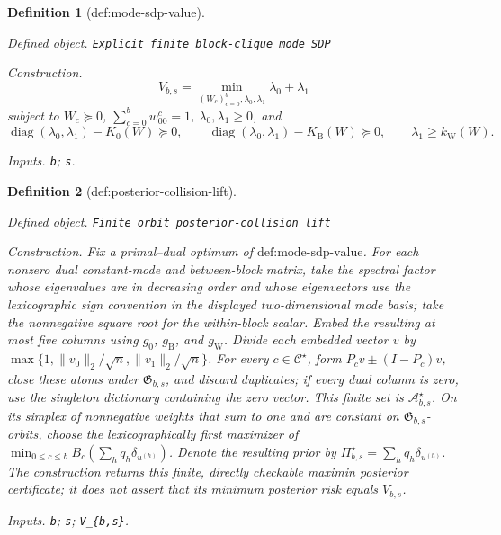 \documentclass{article}
\newtheorem{definition}{Definition}
\begin{document}
\begin{definition}[def:mode-sdp-value]\label{def:mode-sdp-value}
\par\smallskip\noindent\emph{Defined object.} \texttt{Explicit finite block-\allowbreak{}clique mode SDP}
\par\smallskip\noindent\emph{Construction.} \[V_{b,s}=\min_{(W_c)_{c=0}^b,\lambda_0,\lambda_1}\lambda_0+\lambda_1\] subject to \(W_c\succeq0\), \(\sum_{c=0}^bw^c_{00}=1\), \(\lambda_0,\lambda_1\ge0\), and \[\operatorname{diag}(\lambda_0,\lambda_1)-K_0(W)\succeq0,\qquad\operatorname{diag}(\lambda_0,\lambda_1)-K_{\mathrm B}(W)\succeq0,\qquad\lambda_1\ge k_{\mathrm W}(W).\]
\par\smallskip\noindent\emph{Inputs.} \texttt{b}; \texttt{s}.
\end{definition}

\begin{definition}[def:posterior-collision-lift]\label{def:posterior-collision-lift}
\par\smallskip\noindent\emph{Defined object.} \texttt{Finite orbit posterior-\allowbreak{}collision lift}
\par\smallskip\noindent\emph{Construction.} Fix a primal--dual optimum of \(\text{def:mode-sdp-value}\). For each nonzero dual constant-mode and between-block matrix, take the spectral factor whose eigenvalues are in decreasing order and whose eigenvectors use the lexicographic sign convention in the displayed two-dimensional mode basis; take the nonnegative square root for the within-block scalar. Embed the resulting at most five columns using \(g_0\), \(g_{\mathrm B}\), and \(g_{\mathrm W}\). Divide each embedded vector \(v\) by \(\max\{1,\|v_0\|_2/\sqrt n,\|v_1\|_2/\sqrt n\}\). For every \(c\in\mathcal C^{\star}\), form \(P_cv\pm(I-P_c)v\), close these atoms under \(\mathfrak G_{b,s}\), and discard duplicates; if every dual column is zero, use the singleton dictionary containing the zero vector. This finite set is \(\mathcal A_{b,s}^{\star}\). On its simplex of nonnegative weights that sum to one and are constant on \(\mathfrak G_{b,s}\)-orbits, choose the lexicographically first maximizer of \(\min_{0\le c\le b}B_c(\sum_hq_h\delta_{u^{(h)}})\). Denote the resulting prior by \(\Pi_{b,s}^{\star}=\sum_hq_h\delta_{u^{(h)}}\). The construction returns this finite, directly checkable maximin posterior certificate; it does not assert that its minimum posterior risk equals \(V_{b,s}\).
\par\smallskip\noindent\emph{Inputs.} \texttt{b}; \texttt{s}; \texttt{V\_\allowbreak{}\{b,\allowbreak{}s\}\allowbreak{}}.
\end{definition}
\end{document}

